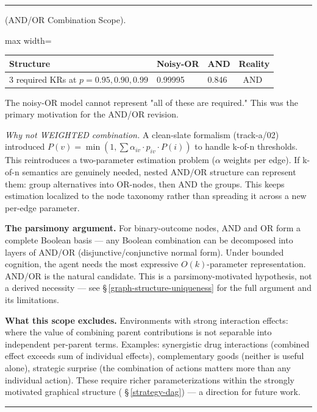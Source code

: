 \documentclass[11pt,oneside]{article}
\newcounter{claim}[section]
\renewcommand{\theclaim}{\thesection.\arabic{claim}}
\newenvironment{segment}[2]{%
  \refstepcounter{claim}%
  \bigskip\noindent\hrule\smallskip
  \noindent{\bfseries #1~\theclaim}\enskip(#2).\par\smallskip
  \noindent\ignorespaces
}{%
  \par\smallskip\noindent\hrule\bigskip
}
\newenvironment{scope}[1][]{\begin{segment}{Scope}{#1}}{\end{segment}}
\begin{document}
\begin{scope}[AND/OR Combination Scope]
\begin{adjustbox}{max width=\textwidth}
\small
\begin{tabular}{llll}
\toprule
Structure & Noisy-OR & AND & Reality \\
\midrule
3 required KRs at $p = 0.95, 0.90, 0.99$ & 0.99995 & 0.846 & ~AND \\
\bottomrule
\end{tabular}
\end{adjustbox}


The noisy-OR model cannot represent "all of these are required." This was the primary motivation for the AND/OR revision.

\textit{Why not WEIGHTED combination.} A clean-slate formalism (track-a/02) introduced $P(v) = \min(1, \sum \alpha_{iv} \cdot p_{iv} \cdot P(i))$ to handle k-of-n thresholds. This reintroduces a two-parameter estimation problem ($\alpha$ weights per edge). If k-of-n semantics are genuinely needed, nested AND/OR structure can represent them: group alternatives into OR-nodes, then AND the groups. This keeps estimation localized to the node taxonomy rather than spreading it across a new per-edge parameter.

\textbf{The parsimony argument.} For binary-outcome nodes, AND and OR form a complete Boolean basis — any Boolean combination can be decomposed into layers of AND/OR (disjunctive/conjunctive normal form). Under bounded cognition, the agent needs the most expressive $O(k)$-parameter representation. AND/OR is the natural candidate. This is a parsimony-motivated hypothesis, not a derived necessity — see \S\,\ref{graph-structure-uniqueness} for the full argument and its limitations.

\textbf{What this scope excludes.} Environments with strong interaction effects: where the value of combining parent contributions is not separable into independent per-parent terms. Examples: synergistic drug interactions (combined effect exceeds sum of individual effects), complementary goods (neither is useful alone), strategic surprise (the combination of actions matters more than any individual action). These require richer parameterizations within the strongly motivated graphical structure ( \S\,\ref{strategy-dag}) — a direction for future work.

\end{scope}
\end{document}
